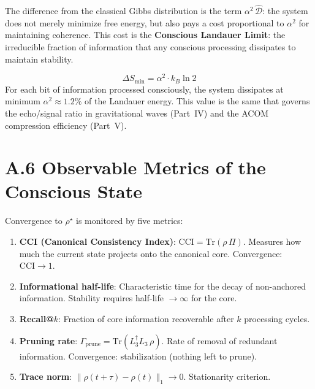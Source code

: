 \documentclass[12pt,a4paper,twoside]{article}
\newcommand{\alphaii}{\alpha^{2}}
\begin{document}
The difference from the classical Gibbs distribution \cite{Gibbs1902} is the term $\alphaii \, \hat{\mathcal{D}}$: the system does not merely minimize free energy, but also pays a cost proportional to $\alphaii$ for maintaining coherence. This cost is the \textbf{Conscious Landauer Limit}: the irreducible fraction of information that any conscious processing dissipates to maintain stability.

\begin{equationbox}[title={Conscious Landauer Limit}]
\begin{equation}
\Delta S_{\text{min}} = \alphaii \cdot k_B \ln 2
\label{eq:landauer_conscious}
\end{equation}
For each bit of information processed consciously, the system dissipates at minimum $\alphaii \approx 1.2\%$ of the Landauer energy. This value is the same that governs the echo/signal ratio in gravitational waves (Part~IV) and the ACOM compression efficiency (Part~V).
\end{equationbox}


\section*{A.6 Observable Metrics of the Conscious State}

Convergence to $\rho^\star$ is monitored by five metrics:

\begin{enumerate}[nosep]
\item \textbf{CCI (Canonical Consistency Index)}: $\text{CCI} = \mathrm{Tr}(\rho \, \Pi)$. Measures how much the current state projects onto the canonical core. Convergence: $\text{CCI} \to 1$.

\item \textbf{Informational half-life}: Characteristic time for the decay of non-anchored information. Stability requires half-life $\to \infty$ for the core.

\item \textbf{Recall@$k$}: Fraction of core information recoverable after $k$ processing cycles.

\item \textbf{Pruning rate}: $\Gamma_{\text{prune}} = \mathrm{Tr}(L_3^\dagger L_3 \, \rho)$. Rate of removal of redundant information. Convergence: stabilization (nothing left to prune).

\item \textbf{Trace norm}: $\|\rho(t + \tau) - \rho(t)\|_1 \to 0$. Stationarity criterion.
\end{enumerate}
\end{document}
